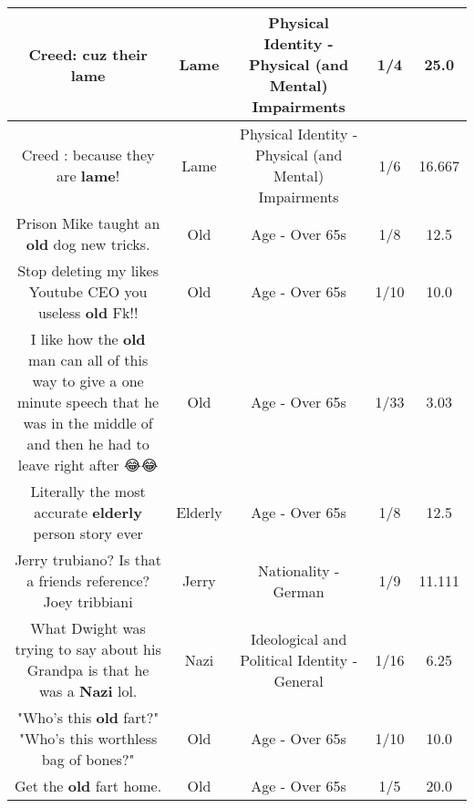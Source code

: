 \documentclass[11pt]{article}
\newlength\mylength
\begin{document}
\begin{center}
\begin{longtable}{|C{.65\mylength}|C{.30\mylength}|C{.12\mylength}|C{.12\mylength}|C{.12\mylength}|}
  \small Creed: cuz their lame\normalsize   & Lame & Physical Identity - Physical (and Mental) Impairments & 1/4 & 25.0 \\  \hline
  \small Creed : because they are \textbf{lame}!\normalsize   & Lame & Physical Identity - Physical (and Mental) Impairments & 1/6 & 16.667 \\  \hline
  \small Prison Mike taught an \textbf{old} dog new tricks.\normalsize   & Old & Age - Over 65s & 1/8 & 12.5 \\  \hline
  \small Stop deleting my likes Youtube CEO you useless \textbf{old} Fk!!\normalsize   & Old & Age - Over 65s & 1/10 & 10.0 \\  \hline
  \small I like how the \textbf{old} man can all of this way to give a one minute speech that he was in the middle of and then he had to leave right after 😂😂\normalsize   & Old & Age - Over 65s & 1/33 & 3.03 \\  \hline
  \small Literally the most accurate \textbf{elderly} person story ever\normalsize   & Elderly & Age - Over 65s & 1/8 & 12.5 \\  \hline
  \small Jerry trubiano? Is that a friends reference? Joey tribbiani\normalsize   & Jerry & Nationality - German & 1/9 & 11.111 \\  \hline
  \small What Dwight was trying to say about his Grandpa is that he was a \textbf{Nazi} lol.\normalsize   & Nazi &  Ideological and Political Identity - General & 1/16 & 6.25 \\  \hline
  \small "Who's this \textbf{old} fart?" "Who's this worthless bag of bones?"\normalsize   & Old & Age - Over 65s & 1/10 & 10.0 \\  \hline
  \small Get the \textbf{old} fart home.\normalsize   & Old & Age - Over 65s & 1/5 & 20.0 \\  \hline

\end{longtable}
\end{center}
\end{document}
